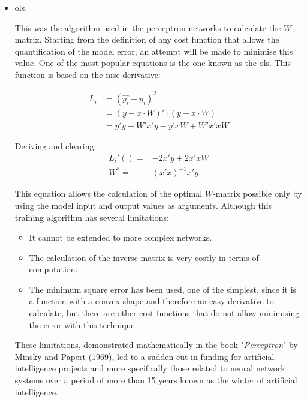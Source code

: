 \begin{itemize}
\item \acrfull{ols}.

This was the algorithm used in the perceptron networks to calculate the $W$ matrix. Starting from the definition of any cost function that allows the quantification of the model error, an attempt will be made to minimise this value. One of the most popular equations is the one known as the \acrlong{ols}. This function is based on the \acrshort{mse} derivative:

\begin{equation}
    \begin{split}
    L_i & =  (\hat{y_i} - y_i)^2 \\
     & = (y - x \cdot W)' \cdot (y - x \cdot W) \\
     & = y'y - W'x'y - y'xW + W'x'x W
  \end{split}
\end{equation}

Deriving and clearing:
\begin{equation}
    \begin{split}
L_i'() = & -2x'y + 2x'xW \\
W^* = & (x'x)^{-1}x'y
\end{split}
\end{equation}


This equation allows the calculation of the optimal $W$-matrix possible only by using the model input and output values as arguments. Although this training algorithm has several limitations:
\begin{itemize}
\item It cannot be extended to more complex networks.
\item The calculation of the inverse matrix is very costly in terms of computation.
\item The minimum square error has been used, one of the simplest, since it is a function with a convex shape and therefore an easy derivative to calculate, but there are other cost functions that do not allow minimising the error with this technique.
\newline
\end{itemize}

These limitations, demonstrated mathematically in the book "\textit{Perceptron}" \cite{papert} by Minsky and Papert (1969), led to a sudden cut in funding for artificial intelligence projects and more specifically those related to neural network systems over a period of more than 15 years known as the winter of artificial intelligence.



\end{itemize}
